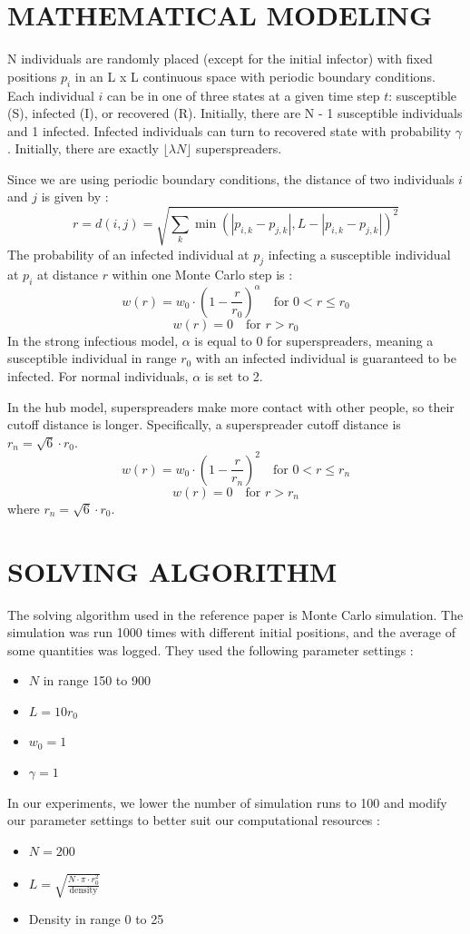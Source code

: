 \documentclass{article}
\begin{document}
\section{MATHEMATICAL MODELING}
N individuals are randomly placed (except for the initial infector) with fixed positions \(p_i\) in an L x L continuous space with periodic boundary conditions. Each individual \(i\) can be in one of three states at a given time step \(t\): susceptible (S), infected (I), or recovered (R). Initially, there are N - 1 susceptible individuals and 1 infected. Infected individuals can turn to recovered state with probability \(\gamma\). Initially, there are exactly \(\lfloor \lambda N \rfloor\) superspreaders.

Since we are using periodic boundary conditions, the distance of two individuals \(i\) and \(j\) is given by :
\[
r = d(i, j) = \sqrt{\sum_k \min(|p_{i, k} - p_{j, k}|, L - |p_{i, k} - p_{j, k}|)^2}
\]
The probability of an infected individual at \(p_j\) infecting a susceptible individual at \(p_i\) at distance \(r\) within one Monte Carlo step is :
\[
w(r) = w_0 \cdot \left(1 - \frac{r}{r_0}\right)^\alpha \quad \text{for } 0 < r \le r_0
\]
\[
w(r) = 0 \quad \text{for } r > r_0
\]
In the strong infectious model, \(\alpha\) is equal to 0 for superspreaders, meaning a susceptible individual in range \(r_0\) with an infected individual is guaranteed to be infected. For normal individuals, \(\alpha\) is set to 2.

In the hub model, superspreaders make more contact with other people, so their cutoff distance is longer. Specifically, a superspreader cutoff distance is \(r_n = \sqrt{6} \cdot r_0\).
\[
w(r) = w_0 \cdot \left(1 - \frac{r}{r_n}\right)^2 \quad \text{for } 0 < r \le r_n
\]
\[
w(r) = 0 \quad \text{for } r > r_n
\]
where \(r_n = \sqrt{6} \cdot r_0\).

\section{SOLVING ALGORITHM}
The solving algorithm used in the reference paper is Monte Carlo simulation. The simulation was run 1000 times with different initial positions, and the average of some quantities was logged. They used the following parameter settings :
\begin{itemize}
    \item \(N\) in range 150 to 900
    \item \(L = 10r_0\)
    \item \(w_0 = 1\)
    \item \(\gamma = 1\)
\end{itemize}
In our experiments, we lower the number of simulation runs to 100 and modify our parameter settings to better suit our computational resources :
\begin{itemize}
    \item \(N = 200\)
    \item \(L = \sqrt{\frac{N \cdot \pi \cdot r_0^2}{\text{density}}}\)
    \item Density in range 0 to 25
\end{itemize}
\end{document}
